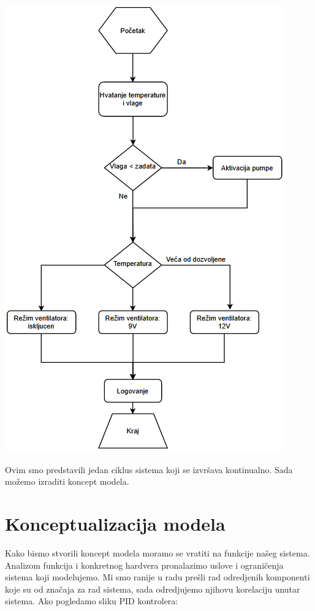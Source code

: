 \documentclass[a4paper,11pt]{book}
\begin{document}
\includegraphics[width=\textwidth]{flow.png}

Ovim smo predstavili jedan ciklus sistema koji se izvršava kontinualno. Sada možemo izraditi koncept modela.


\section{Konceptualizacija modela}

Kako bismo stvorili koncept modela moramo se vratiti na funkcije našeg sistema. Analizom funkcija i konkretnog hardvera pronalazimo uslove i ograničenja sistema koji modelujemo. Mi smo ranije u radu prešli rad odredjenih komponenti koje su od značaja za rad sistema, sada odredjujemo njihovu korelaciju unutar sistema. Ako pogledamo sliku PID kontrolera:
\end{document}
